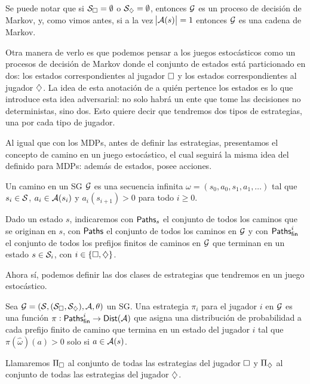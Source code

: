 Se puede notar que si $\mathcal{S}_\square = \emptyset$ o $\mathcal{S}_\diamondsuit = \emptyset$,
entonces $\mathcal{G}$ es un proceso de decisión de Markov, y, como vimos antes, si a la
vez $\abs{\mathcal{A}(s)} = 1$ entonces $\mathcal{G}$ es una cadena de Markov.

Otra manera de verlo es que podemos pensar a los juegos estocásticos como un
procesos de decisión de Markov donde el conjunto de estados está particionado
en dos: los estados correspondientes al jugador $\square$ y los estados
correspondientes al jugador $\diamondsuit$. La idea de esta anotación de a quién
pertence los estados es lo que introduce esta idea adversarial: no solo habrá
un ente que tome las decisiones no deterministas, sino dos. Esto quiere decir
que tendremos dos tipos de estrategias, una por cada tipo de jugador.

Al igual que con los MDPs, antes de definir las estrategias, presentamos el
concepto de camino en un juego estocástico, el cual seguirá la misma idea del
definido para MDPs: además de estados, posee acciones.

\begin{definition}[Camino en un SG]
	Un camino en un SG $\mathcal{G}$ es una secuencia infinita $\omega = (s_0, a_0, s_1, a_1, \dots)$ tal que $s_i \in \mathcal{S}$, $a_i \in \mathcal{A}(s_i)$ y $a_i(s_{i+1}) > 0$ para todo $i \geq 0$.

	Dado un estado $s$, indicaremos con $\textsf{Paths}_s$ el conjunto de todos los caminos
	que se originan en $s$, con $\textsf{Paths}$ el conjunto de todos los caminos en $\mathcal{G}$ y
	con $\textsf{Paths}_\textsf{fin}^i$ el conjunto de todos los prefijos finitos de caminos en $\mathcal{G}$
	que terminan en un estado $s \in \mathcal{S}_i$, con $i \in \{\square, \diamondsuit\}$.
\end{definition}

Ahora sí, podemos definir las dos clases de estrategias que tendremos en un
juego estocástico.

\begin{definition}
	Sea $\mathcal{G} = (\mathcal{S}, (\mathcal{S}_\square, \mathcal{S}_\diamondsuit), \mathcal{A}, \theta)$ un SG. Una estrategia $\pi_i$ para el jugador $i$ en $\mathcal{G}$ es una función $\pi: \textsf{Paths}_\textsf{fin}^i \rightarrow \mathsf{Dist} (\mathcal{A})$ que asigna una distribución de probabilidad a cada prefijo finito de camino que termina en un estado del jugador $i$ tal que $\pi(\hat \omega) (a) > 0$ solo si $a \in \mathcal{A}(s)$.

	Llamaremos $\Pi_\square$ al conjunto de todas las estrategias del jugador $\square$
	y $\Pi_\diamondsuit$ al conjunto de todas las estrategias del jugador $\diamondsuit$.
\end{definition}

